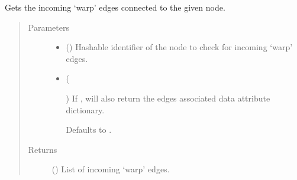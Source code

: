 \documentclass[letterpaper,10pt,english]{sphinxmanual}
\begin{document}
\begin{fulllineitems}
\begin{fulllineitems}
\begin{quote}
\begin{description}
\end{description}\end{quote}

\end{fulllineitems}


\begin{fulllineitems}
\label{\detokenize{cockatoo:cockatoo.KnitDiNetwork.node_warp_edges_in}}
Gets the incoming ‘warp’ edges connected to the given node.
\begin{quote}\begin{description}
\item[{Parameters}] \leavevmode\begin{itemize}
\item {} 
 () \textendash{} Hashable identifier of the node to check for incoming ‘warp’ edges.

\item {} 
 (%
\begin{footnote}[150]\sphinxAtStartFootnote
{}
%
\end{footnote}\sphinxstyleliteralemphasis{\sphinxupquote{, }}) \textendash{} 
If , will also return the edges associated data attribute
dictionary.

Defaults to .


\end{itemize}

\item[{Returns}] \leavevmode
{} () \textendash{} List of incoming ‘warp’ edges.

\end{description}\end{quote}

\end{fulllineitems}


\end{fulllineitems}
\end{document}
